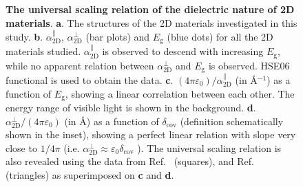 
\begin{figure}[H]
\centering
\caption{\label{fig-3} \textbf{The universal scaling relation of the
    dielectric nature of 2D materials}. \textbf{a}. The structures of
  the 2D materials investigated in this
  study. \textbf{b}. $\alpha_{\mathrm{2D}}^{\parallel}$,
  $\alpha_{\mathrm{2D}}^{\perp}$ (bar plots) and $E_{\mathrm{g}}$
  (blue dots) for all the 2D materials studied.
  $\alpha_{\mathrm{2D}}^{\parallel}$ is observed to descend with
  increasing $E_{\mathrm{g}}$, while no apparent relation between
  $\alpha_{\mathrm{2D}}^{\perp}$ and $E_{\mathrm{g}}$ is
  observed. HSE06 functional is used to obtain the data. \textbf{c}.
  $(4\pi \varepsilon_{0})/\alpha_{\mathrm{2D}}^{\parallel}$ (in
  \AA{}$^{-1}$) as a function of $E_{\mathrm{g}}$, showing a linear
  correlation between each other. The energy range of visible light is
  shown in the background. \textbf{d}.
  $\alpha_{\mathrm{2D}}^{\perp}/(4\pi\varepsilon_{0})$ (in \AA{}) as a
  function of $\delta_{\mathrm{cov}}$ (definition schematically shown
  in the inset), showing a perfect linear relation with slope very
  close to $1/4\pi$ (i.e.
  $\alpha_{\mathrm{2D}}^{\perp} \approx \varepsilon_{0}
  \delta_{\mathrm{cov}}$ ). The universal scaling relation is also
  revealed using the data from Ref.~\cite{Haastrup_2018} (squares),
  and Ref.~\cite{Mounet_2018} (triangles) as superimposed on
  \textbf{c} and \textbf{d}.}
\end{figure}





